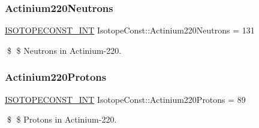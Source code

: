 \subsubsection{\texorpdfstring{Actinium220\+Neutrons}{Actinium220Neutrons}}
{\footnotesize\ttfamily \mbox{\hyperlink{group___isotope_const-_macros_ga5f18360b3e99483a35c32d789e62621c}{I\+S\+O\+T\+O\+P\+E\+C\+O\+N\+S\+T\+\_\+\+I\+NT}} Isotope\+Const\+::\+Actinium220\+Neutrons = 131}

\$ \$ Neutrons in Actinium-\/220. \mbox{\label{group___isotope_const-_actinium-_ac220_ga03cac6513bd7a7146f0bf1a51ca90b5b}} 
\subsubsection{\texorpdfstring{Actinium220\+Protons}{Actinium220Protons}}
{\footnotesize\ttfamily \mbox{\hyperlink{group___isotope_const-_macros_ga5f18360b3e99483a35c32d789e62621c}{I\+S\+O\+T\+O\+P\+E\+C\+O\+N\+S\+T\+\_\+\+I\+NT}} Isotope\+Const\+::\+Actinium220\+Protons = 89}

\$ \$ Protons in Actinium-\/220. 
